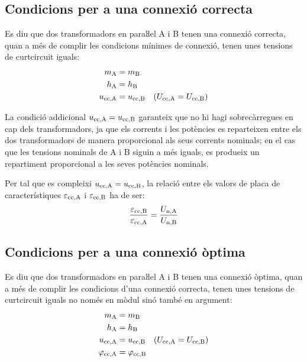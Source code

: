 \subsection{Condicions per a una connexió correcta}
 Es diu que dos transformadors en paraŀlel  A i B tenen una connexió correcta, quan a més de complir les condicions mínimes de connexió, tenen unes tensions de curtcircuit iguals:
\begin{align}
    m_\mathrm{A} &= m_\mathrm{B}\\
    h_\mathrm{A} &= h_\mathrm{B}\\
    u_\mathrm{cc,A} &= u_\mathrm{cc,B} \quad (U_\mathrm{cc,A} = U_\mathrm{cc,B})
\end{align}

La condició addicional  $u_\mathrm{cc,A} = u_\mathrm{cc,B}$ garanteix que no hi hagi sobrecàrregues en cap dels transformadors, ja que els corrents i les potències es reparteixen entre els dos transformadors de manera proporcional als seus corrents nominals; en el cas que les tensions nominals de A i B siguin a més iguals, es produeix un repartiment proporcional a les seves potències nominals.

Per tal que es compleixi $u_\mathrm{cc,A} = u_\mathrm{cc,B}$, la relació entre els valors de placa de característiques $\varepsilon_\mathrm{cc,A}$ i $\varepsilon_\mathrm{cc,B}$ ha de ser:
\begin{equation}
    \frac{\varepsilon_\mathrm{cc,B}}{\varepsilon_\mathrm{cc,A}} = \frac{U_\mathrm{n,A}}{U_\mathrm{n,B}}
\end{equation}

\subsection{Condicions per a una connexió òptima}

 Es diu que dos transformadors en paraŀlel A i B tenen una connexió òptima, quan a més de complir les condicions d'una connexió correcta, tenen unes tensions de curtcircuit iguals no només en mòdul sinó també en argument:
\begin{align}
    m_\mathrm{A} &= m_\mathrm{B}\\
    h_\mathrm{A} &= h_\mathrm{B}\\
    u_\mathrm{cc,A} &= u_\mathrm{cc,B} \quad (U_\mathrm{cc,A} = U_\mathrm{cc,B})\\
    \varphi_\mathrm{cc,A} &=\varphi_\mathrm{cc,B}
\end{align}

